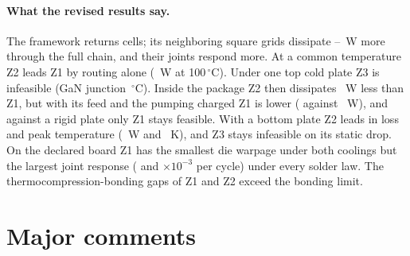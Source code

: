 \documentclass[10pt]{article}
\newcommand{\degC}{\,$^\circ$C}
\begin{document}
\paragraph{What the revised results say.} The framework returns \FrDseOptM{} cells; its neighboring
square grids dissipate \FrChainMarginLo--\FrChainMarginHi~W more through the full chain, and their
joints respond more. At a common
temperature Z2 leads Z1 by routing alone (\WrIsoGapHiZtwo~W at 100\degC). Under one top cold plate
Z3 is infeasible (GaN junction \TjAZthree\degC). Inside the package Z2 then dissipates \GapAZtwo~W
less than Z1, but with its feed and the pumping charged Z1 is lower (\PlatAZone{} against
\PlatAZtwo~W), and against a rigid plate only Z1 stays feasible. With a bottom plate Z2 leads in loss
and peak temperature (\GapBZtwo~W and \dTmaxTierBZtwo~K), and Z3 stays infeasible on its static
drop. On the declared board Z1 has the smallest die warpage under both coolings but the largest
joint response
(\MvEpsAZone{} and \MvEpsBZone$\times10^{-3}$ per cycle) under every solder law. The
thermocompression-bonding gaps of Z1 and Z2 exceed the bonding limit.

\section*{Major comments}
\end{document}
